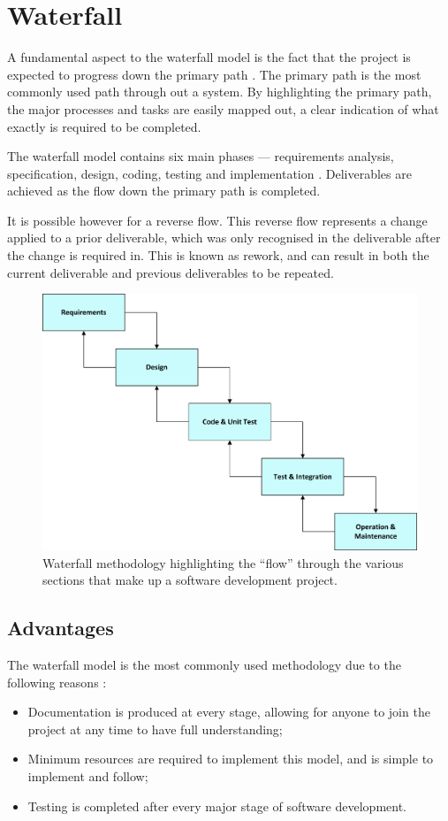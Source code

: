 \section{Waterfall}
A fundamental aspect to the waterfall model is the fact that the project is 
expected to progress down the primary path \citep{sergei:2012:Online}. The 
primary path is the most commonly used path through out a system. By 
highlighting the primary path, the major processes and tasks are easily mapped
out, a clear indication of what exactly is required to be completed.

The waterfall model contains six main phases --- requirements analysis, 
specification, design, coding, testing and implementation \citep{dawson09}. 
Deliverables are achieved as the flow down the primary path is completed. 

It is possible however for a reverse flow. This reverse flow represents a 
change applied to a prior deliverable, which was only recognised in the 
deliverable after the change is required in. This is known as rework, and can 
result in both the current deliverable and previous deliverables to be 
repeated.

\begin{figure}[H]
  \centering
  \includegraphics[scale=0.6]{chapter6/waterfall.png}
    \caption[Waterfall methodology]
      {Waterfall methodology highlighting the ``flow'' through the various 
      sections that make up a software development project.}
\end{figure}

\subsection{Advantages}
The waterfall model is the most commonly used methodology due to the following 
reasons \citep{alam:2012:Online}:
\begin{itemize}
	\item Documentation is produced at every stage, allowing for anyone to join
        the project at any time to have full understanding;
  \item Minimum resources are required to implement this model, and is simple
        to implement and follow;
  \item Testing is completed after every major stage of software development.
\end{itemize}

